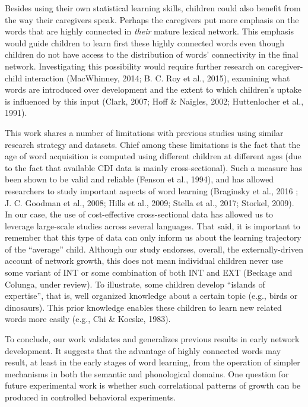 \documentclass[english,floatsintext,man]{apa6}
\theoremstyle{definition}
\theoremstyle{definition}
\theoremstyle{definition}
\theoremstyle{remark}
\begin{document}
Besides using their own statistical learning skills, children could also
benefit from the way their caregivers speak. Perhaps the caregivers put
more emphasis on the words that are highly connected in \emph{their}
mature lexical network. This emphasis would guide children to learn
first these highly connected words even though children do not have
access to the distribution of words' connectivity in the final network.
Investigating this possibility would require further research on
caregiver-child interaction (MacWhinney, 2014; B. C. Roy et al., 2015),
examining what words are introduced over development and the extent to
which children's uptake is influenced by this input (Clark, 2007; Hoff
\& Naigles, 2002; Huttenlocher et al., 1991).

This work shares a number of limitations with previous studies using
similar research strategy and datasets. Chief among these limitations is
the fact that the age of word acquisition is computed using different
children at different ages (due to the fact that available CDI data is
mainly cross-sectional). Such a measure has been shown to be valid and
reliable (Fenson et al., 1994), and has allowed researchers to study
important aspects of word learning (Braginsky et al., 2016 ; J. C.
Goodman et al., 2008; Hills et al., 2009; Stella et al., 2017; Storkel,
2009). In our case, the use of cost-effective cross-sectional data has
allowed us to leverage large-scale studies across several languages.
That said, it is important to remember that this type of data can only
inform us about the learning trajectory of the \enquote{average} child.
Although our study endorses, overall, the externally-driven account of
network growth, this does not mean individual children never use some
variant of INT or some combination of both INT and EXT (Beckage and
Colunga, under review). To illustrate, some children develop
\enquote{islands of expertise}, that is, well organized knowledge about
a certain topic (e.g., birds or dinosaurs). This prior knowledge enables
these children to learn new related words more easily (e.g., Chi \&
Koeske, 1983).

To conclude, our work validates and generalizes previous results in
early network development. It suggests that the advantage of highly
connected words may result, at least in the early stages of word
learning, from the operation of simpler mechanisms in both the semantic
and phonological domains. One question for future experimental work is
whether such correlational patterns of growth can be produced in
controlled behavioral experiments.
\end{document}
